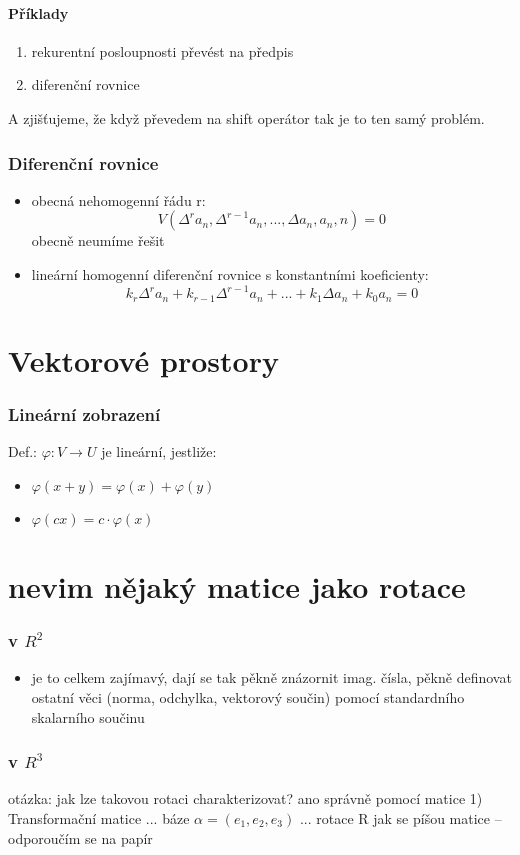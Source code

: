 \documentclass{article}
\begin{document}
\subsection{Příklady}
\begin{enumerate}
  \item rekurentní posloupnosti převést na předpis
  \item diferenční rovnice
\end{enumerate}
A zjišťujeme, že když převedem na shift operátor tak je to ten samý problém.

\section{Diferenční rovnice}
\begin{itemize}
  \item obecná nehomogenní řádu r: $$V(\Delta^r a_n, \Delta^{r-1} a_n,..., \Delta a_n, a_n, n) = 0$$ obecně neumíme řešit
  \item lineární homogenní diferenční rovnice s konstantními koeficienty: $$ k_r \Delta^r a_n + k_{r-1} \Delta^{r-1} a_n + ... + k_1 \Delta a_n + k_0 a_n = 0$$
\end{itemize}

\part{Vektorové prostory}
\section{Lineární zobrazení}
Def.: $\varphi: V \rightarrow U$ je lineární, jestliže:
\begin{itemize}
  \item $\varphi (x+y) = \varphi (x) + \varphi (y)$
  \item $\varphi (cx) = c \cdot \varphi (x)$
\end{itemize}

\part{nevim nějaký matice jako rotace}
\section{v $R^2$}
\begin{itemize}
  \item je to celkem zajímavý, dají se tak pěkně znázornit imag. čísla, pěkně definovat ostatní věci (norma, odchylka, vektorový součin) pomocí standardního skalarního součinu
\end{itemize}

\section{v $R^3$}
otázka: jak lze takovou rotaci charakterizovat? ano správně pomocí matice
1) Transformační matice
... báze $\alpha = (e_1, e_2, e_3)$
... rotace R
jak se píšou matice -- odporoučím se na papír
\end{document}

